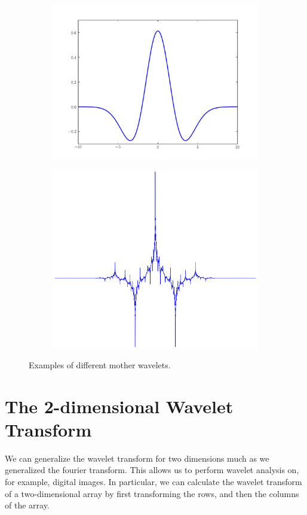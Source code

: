 \begin{figure}[H]
\begin{subfigure}[b]{0.45\textwidth}
    \includegraphics[width=\textwidth]{mexicanHat}
\end{subfigure}
\begin{subfigure}[b]{0.45\textwidth}
    \includegraphics[width=\textwidth]{db5_3}
\end{subfigure}
\caption{Examples of different mother wavelets.}
\label{fig:more_wavelets}
\end{figure}

\section*{The 2-dimensional Wavelet Transform}
We can generalize the wavelet transform for two dimensions much as we generalized the fourier transform.
This allows us to perform wavelet analysis on, for example, digital images.
In particular, we can calculate the wavelet transform of a two-dimensional
array  by first transforming the rows, and then the columns of the array.

